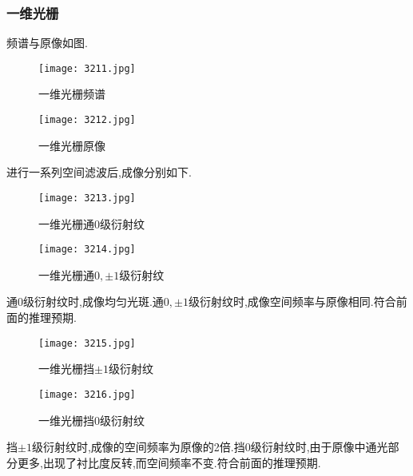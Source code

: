 \documentclass[10pt]{ctexart}
\begin{document}
\subsubsection{一维光栅}
频谱与原像如图.
\begin{figure}[H]
\begin{minipage}[t]{0.5\linewidth}
\centering
\texttt{[image: 3211.jpg]}
\caption{一维光栅频谱}
\end{minipage}
\hfill
\begin{minipage}[t]{0.5\linewidth}
\centering
\texttt{[image: 3212.jpg]}
\caption{一维光栅原像}
\end{minipage}
\end{figure}
进行一系列空间滤波后,成像分别如下.
\begin{figure}[H]
\begin{minipage}[t]{0.5\linewidth}
\centering
\texttt{[image: 3213.jpg]}
\caption{一维光栅通$0$级衍射纹}
\end{minipage}
\hfill
\begin{minipage}[t]{0.5\linewidth}
\centering
\texttt{[image: 3214.jpg]}
\caption{一维光栅通$0,\pm 1$级衍射纹}
\end{minipage}
\end{figure}
通0级衍射纹时,成像均匀光斑.通$0,\pm 1$级衍射纹时,成像空间频率与原像相同.符合前面的推理预期.
\begin{figure}[H]
\begin{minipage}[t]{0.5\linewidth}
\centering
\texttt{[image: 3215.jpg]}
\caption{一维光栅挡$\pm 1$级衍射纹}
\end{minipage}
\hfill
\begin{minipage}[t]{0.5\linewidth}
\centering
\texttt{[image: 3216.jpg]}
\caption{一维光栅挡$0$级衍射纹}
\end{minipage}
\end{figure}
挡$\pm 1$级衍射纹时,成像的空间频率为原像的2倍.挡$0$级衍射纹时,由于原像中通光部分更多,出现了衬比度反转,而空间频率不变.符合前面的推理预期.
\end{document}
